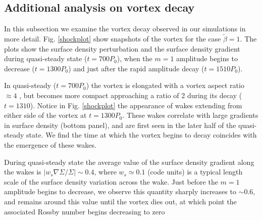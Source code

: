 



\subsection{Additional analysis on vortex decay}
In this subsection we examine the vortex decay observed in our
simulations in more detail. Fig. \ref{shockplot} show snapshots
of the vortex for the case $\tilde{\beta}=1$. The plots show the surface
density perturbation and the surface density gradient during
quasi-steady state ($t=700P_0$), when the $m=1$ amplitude begins to
decrease ($t=1300P_0$) and just after the rapid amplitude decay
($t=1510P_0$). 

In quasi-steady ($t=700P_0$) the vortex is elongated with a vortex aspect ratio $ \approx 4$
, but becomes more compact approaching a ratio of 2 during its decay ($t=1310$).   
Notice in Fig. \ref{shockplot} the appearance of wakes extending from
either side of the vortex at $t=1300P_0$. These 
wakes correlate with large gradients in surface density (bottom
panel), and are first seen in the later half of the quasi-steady
state. We find the time at which 
the vortex begins to decay coincides with the emergence of these
wakes. %

During quasi-steady state the average value of the surface density gradient
along the wakes is $|w_s\nabla\Sigma/\Sigma| \sim 0.4 $, where 
$w_s\simeq0.1$ (code units) is a typical length scale of 
the surface density variation across the wake.   
Just before the $m=1$ amplitude begins to decrease, we observe this quantity
sharply increases to $ \sim 0.6 $, and remains around this value
until the vortex dies out, at which point the associated Rossby number
begins decreasing to zero


